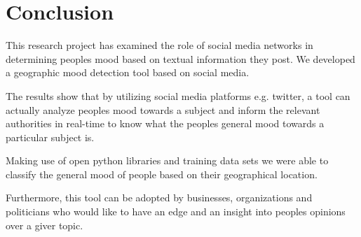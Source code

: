 \chapter{Conclusion}
This research project has examined the role of social media networks in determining peoples mood based on textual information they post. We developed a geographic mood detection tool based on social media.

The results show that by utilizing social media platforms e.g. twitter, a tool can actually analyze peoples mood towards a subject and inform the relevant authorities in real-time to know what the people\textquotesingle s general mood towards a particular subject is.

Making use of open python libraries and training data sets we were able to classify the general mood 
of people based on their geographical location.

Furthermore, this tool can be adopted by businesses, organizations and politicians who would like to have an edge and an insight into peoples opinions over a giver topic.


















